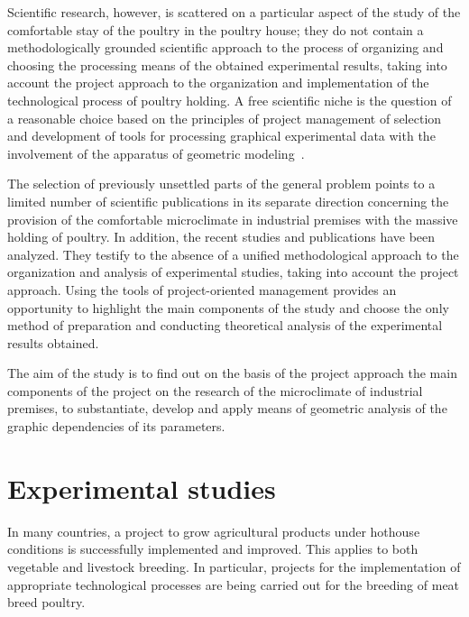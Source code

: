 \documentclass[12pt,twoside]{article}
\begin{document}
\begin{JGGarticle}
			Scientific research, however, is scattered on a particular aspect of the study of the comfortable stay of the poultry in the poultry house; they do not contain a methodologically grounded scientific approach to the process of organizing and choosing the processing means of the obtained experimental results, taking into account the project approach \cite{bi:Khmel-Ljaskovska.2016} to the organization and implementation of the technological process of poultry holding. A free scientific niche is the question of a reasonable choice based on the principles of project management of selection and development of tools for processing graphical experimental data with the involvement of the apparatus of geometric modeling~\cite{bi:Gumen.2001,bi:Gumen-Martyn.2016,bi:Gumen-Shyyko.2011,bi:Gumen-Martyn.2012,bi:Gumen.2012,bi:Gumen-Martyn.1998,bi:Ivanov.2007}.
			
			The selection of previously unsettled parts of the general problem points to a limited number of scientific publications in its separate direction concerning the provision of the comfortable microclimate in industrial premises with the massive holding of poultry. In addition, the recent studies and publications have been analyzed. They testify to the absence of a unified methodological approach to the organization and analysis of experimental studies, taking into account the project approach. Using the tools of project-oriented management provides an opportunity to highlight the main components of the study and choose the only method of preparation and conducting theoretical analysis of the experimental results obtained.
			
			The aim of the study is to find out on the basis of the project approach the main components of the project on the research of the microclimate of industrial premises, to substantiate, develop and apply means of geometric analysis of the graphic dependencies of its parameters.
		\section{Experimental studies}
			In many countries, a project to grow agricultural products under hothouse conditions is successfully implemented and improved. This applies to both vegetable and livestock breeding. In particular, projects for the implementation of appropriate technological processes are being carried out for the breeding of meat breed poultry.
			

\end{JGGarticle}
\end{document}
